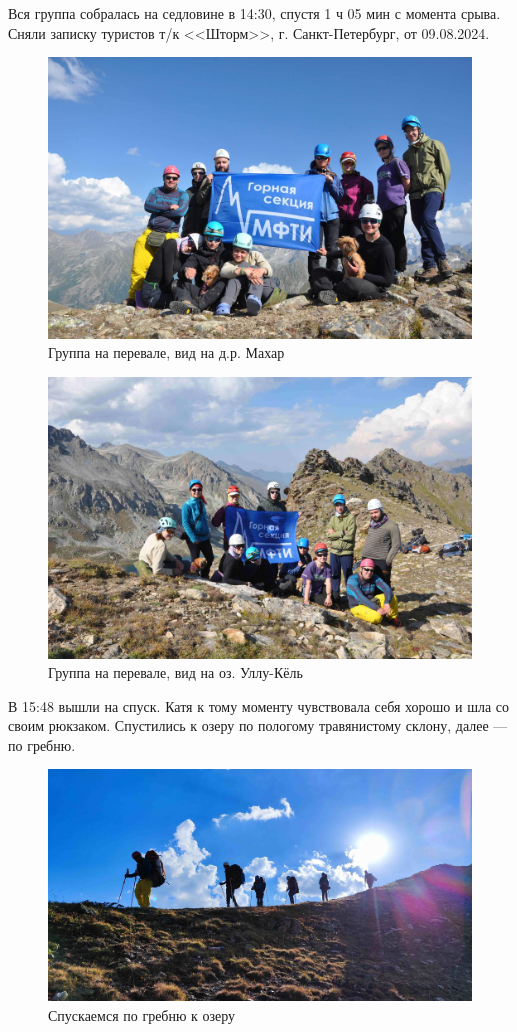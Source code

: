 Вся группа собралась на седловине в 14:30, спустя 1 ч 05 мин с момента срыва. Сняли записку туристов т/к <<Шторм>>, г. Санкт-Петербург, от 09.08.2024.
\begin{figure}[h!]
	\centering
	\includegraphics[width=0.7\linewidth]{../pics/DSC_0982}
	\caption{Группа на перевале, вид на д.р. Махар}
	\label{fig:DSC_0982}
\end{figure}
\begin{figure}[h!]
	\centering
	\includegraphics[width=0.7\linewidth]{../pics/DSC_0986}
	\caption{Группа на перевале, вид на оз. Уллу-Кёль}
	\label{fig:DSC_0986}
\end{figure}

В 15:48 вышли на спуск. Катя к тому моменту чувствовала себя хорошо и шла со своим рюкзаком.
Спустились к озеру по пологому травянистому склону, далее --- по гребню.
\begin{figure}[h!]
	\centering
	\includegraphics[width=0.7\linewidth]{../pics/IMG_20240820_164917.jpg}
	\caption{Спускаемся по гребню к озеру}
	\label{fig:IMG_20240820_164917.jpg}
\end{figure}

